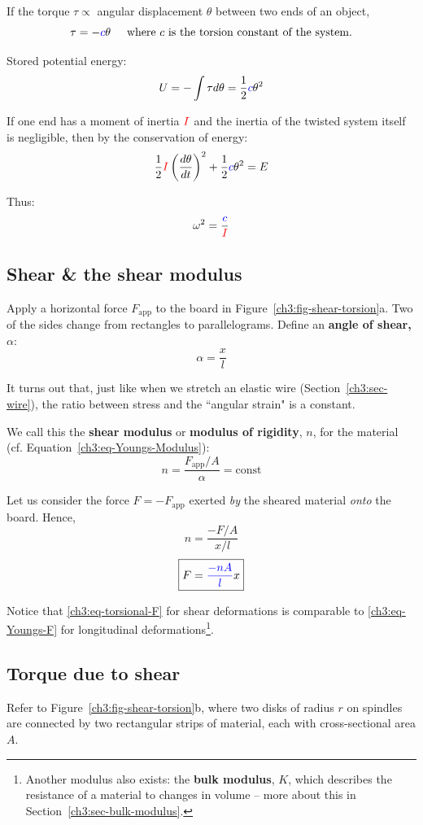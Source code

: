 \documentclass[11pt,letterpaper,titlepage,oneside]{book}
\newcommand{\htab}{\hspace{0.5cm}}
\newcommand{\where}{\htab\text{where }}
\newcommand{\kcol}[1]{\textcolor{blue}{#1}}
\newcommand{\mcol}[1]{\textcolor{red}{#1}}
\begin{document}
If the torque $\tau \propto$ angular displacement $\theta$ between two ends of an object,
\[ \tau=-\kcol{c}\theta \where\text{$c$ is the torsion constant of the system.} \]

Stored potential energy: \[ U= -\int \tau d\theta = \frac{1}{2} \kcol{c}\theta^2 \]

If one end has a moment of inertia $\mcol{I}$ and the inertia of the twisted system itself is negligible, then by the conservation of energy:
\[ \frac{1}{2} \mcol{I} \left( \frac{d\theta}{dt}\right)^2 + \frac{1}{2} \kcol{c}\theta^2 = E \]

Thus:
\begin{equation*}
\omega^2 = \frac{\kcol{c}}{\mcol{I}}
\end{equation*}

\subsection{Shear \& the shear modulus}
Apply a horizontal force $F_\text{app}$ to the board in Figure~\ref{ch3:fig-shear-torsion}a. Two of the sides change from rectangles to parallelograms. Define an \textbf{angle of shear, $\alpha$}:
\[ \alpha = \frac{x}{l} \]

It turns out that, just like when we stretch an elastic wire (Section~\ref{ch3:sec-wire}), the ratio between stress and the ``angular strain" is a constant.

We call this the \textbf{shear modulus} or \textbf{modulus of rigidity}, $n$, for the material (cf. Equation~\ref{ch3:eq-Youngs-Modulus}):
\[  n= \frac{F_\text{app}/A}{\alpha} = \text{const} \]

Let us consider the force $F=-F_\text{app}$ exerted \emph{by} the sheared material \emph{onto} the board. Hence,
\[  n = \frac{-F/A}{x/l} \]
\begin{equation}
	\boxed{F = \kcol{\frac{-nA}{l}} x}  \label{ch3:eq-torsional-F}
\end{equation}

Notice that \eqref{ch3:eq-torsional-F} for {shear deformations} is comparable to \eqref{ch3:eq-Youngs-F} for {longitudinal deformations}\footnote{Another modulus also exists: the \textbf{bulk modulus}, $K$, which describes the resistance of a material to changes in volume -- more about this in Section~\ref{ch3:sec-bulk-modulus}.}.

\subsection{Torque due to shear}
Refer to Figure~\ref{ch3:fig-shear-torsion}b, where two disks of radius $r$ on spindles are connected by two rectangular strips of material, each with cross-sectional area $A$.
\end{document}
